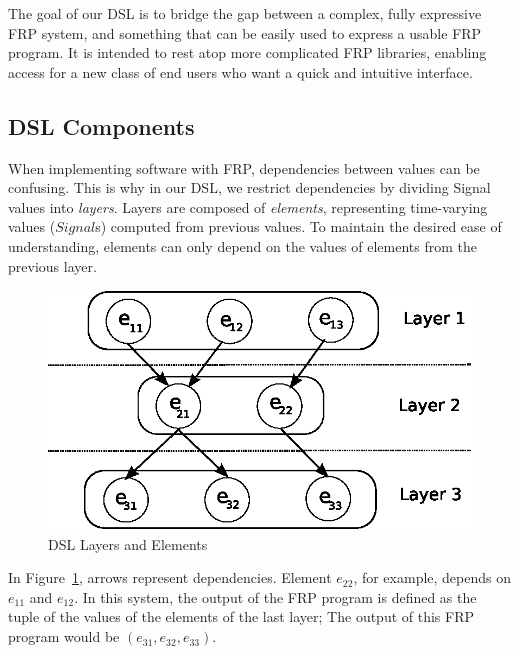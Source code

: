\documentclass[twocolumn,11pt,english]{article}
\begin{document}
The goal of our DSL is to bridge the gap between a complex, fully expressive FRP system, and something that can be easily used to express a usable FRP program. It is intended to rest atop more complicated FRP libraries, enabling access for a new class of end users who want a quick and intuitive interface.

\subsection{DSL Components}

When implementing software with FRP, dependencies between values can be confusing. This is why in our DSL, we restrict dependencies by dividing Signal values into \textit{layers}. Layers are composed of \textit{elements}, representing time-varying values ($Signal$s) computed from previous values. To maintain the desired ease of understanding, elements can only depend on the values of elements from the previous layer. 

\begin{figure}[h!]
  \includegraphics[scale=0.8]{layers.eps}
\caption{DSL Layers and Elements}
\label{fig:layers}
\end{figure}

In Figure~\ref{fig:layers}, arrows represent dependencies. Element $e_{22}$, for example, depends on $e_{11}$ and $e_{12}$. In this system, the output of the FRP program is defined as the tuple of the values of the elements of the last layer; The output of this FRP program would be $(e_{31}, e_{32}, e_{33})$.
\end{document}

